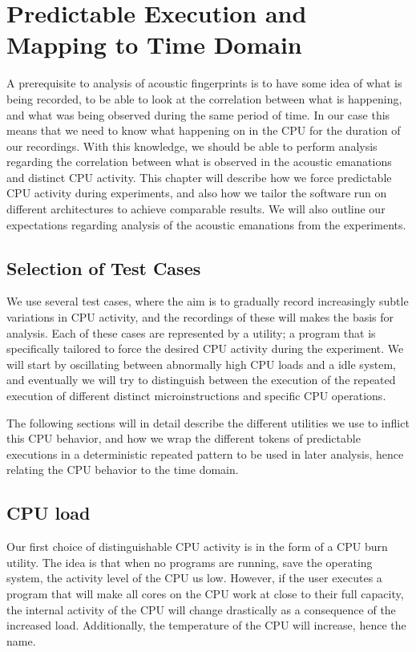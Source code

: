 \chapter{Predictable Execution and Mapping to Time Domain}\label{chp4:predictable_execution} 
A prerequisite to analysis of acoustic fingerprints is to have some idea of what is being recorded, to be able to look at the correlation between what is happening, and what was being observed during the same period of time.
In our case this means that we need to know what happening on in the \gls{CPU} for the duration of our recordings.
With this knowledge, we should be able to perform analysis regarding the correlation between what is observed in the acoustic emanations and distinct \gls{CPU} activity.
This chapter will describe how we force predictable \gls{CPU} activity during experiments, and also how we tailor the software run on different architectures to achieve comparable results.
We will also outline our expectations regarding analysis of the acoustic emanations from the experiments.

\section{Selection of Test Cases}
We use several test cases, where the aim is to gradually record increasingly subtle variations in \gls{CPU} activity, and the recordings of these will makes the basis for analysis.
Each of these cases are represented by a utility; a program that is specifically tailored to force the desired \gls{CPU} activity during the experiment.
We will start by oscillating between abnormally high \gls{CPU} loads and a idle system, and eventually we will try to distinguish between the execution of the repeated execution of different distinct microinstructions and specific \gls{CPU} operations.

The following sections will in detail describe the different utilities we use to inflict this \gls{CPU} behavior, and how we wrap the different tokens of predictable executions in a deterministic repeated pattern to be used in later analysis, hence relating the \gls{CPU} behavior to the time domain.

\section{CPU load}\label{chp4:sec:cpu_load}
Our first choice of distinguishable \gls{CPU} activity is in the form of a \gls{CPU} burn utility. 
The idea is that when no programs are running, save the operating system, the activity level of the \gls{CPU} us low. 
However, if the user executes a program that will make all cores on the \gls{CPU} work at close to their full capacity, the internal activity of the \gls{CPU} will change drastically as a consequence of the increased load.
Additionally, the temperature of the \gls{CPU} will increase, hence the name.

